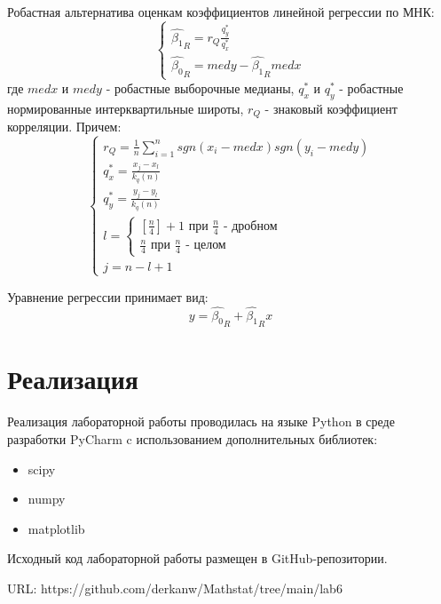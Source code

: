 \documentclass[12pt,a4paper]{article}
\begin{document}
Робастная альтернатива оценкам коэффициентов линейной регрессии по МНК:
\begin{equation}
    \left\{
    \begin{array}{ll}
        \hat{\beta_1}_R=r_Q\frac{q^*_y}{q^*_x}\\
        \hat{\beta_0}_R=medy-\hat{\beta_1}_R medx
    \end{array}
    \right.
\end{equation}
где $med x$ и $med y$ - робастные выборочные медианы, $q^*_x$ и $q^*_y$ - робастные нормированные интерквартильные широты, $r_Q$ - знаковый коэффициент корреляции. Причем:
\begin{equation}
    \left\{
    \begin{array}{ll}
        r_Q=\frac{1}{n}\sum_{i=1}^n{sgn(x_i-medx)sgn(y_i-medy)}\\
        q^*_x=\frac{x_j-x_l}{k_q(n)}\\
        q^*_y=\frac{y_j-y_l}{k_q(n)}\\
        l=\begin{cases}
                [\frac{n}{4}]+1\text{ при }\frac{n}{4}\text{ - дробном}\\ 
                \frac{n}{4}\text{ при }\frac{n}{4}\text{ - целом}
            \end{cases}\\
        j=n-l+1
    \end{array}
    \right.
\end{equation}

Уравнение регрессии принимает вид:
\begin{equation}
    y=\hat{\beta_0}_R+\hat{\beta_1}_Rx
\end{equation}

\section{Реализация}
Реализация лабораторной работы проводилась на языке Python в среде разработки PyCharm c использованием дополнительных библиотек:
\begin{itemize}
    \item scipy
    \item numpy
    \item matplotlib
\end{itemize}

Исходный код лабораторной работы размещен в GitHub-репозитории.

URL: https://github.com/derkanw/Mathstat/tree/main/lab6
\end{document}
